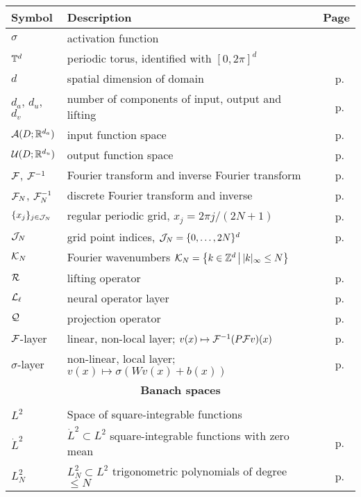 \documentclass[reqno,a4paper]{amsart}
\begin{document}
\begin{center}

\begin{tabular}{l p{}  r}
\textbf{Symbol} & \textbf{Description} & \textbf{Page}
\\
\hline
$\sigma$ & activation function & \\
$\mathbb{T}^d$ & periodic torus, identified with $[0,2\pi]^d$ & \\
$d$ & spatial dimension of domain & p.~\pageref{setting} \\
$d_a$, $d_u$, $d_v$ & number of components of input, output and lifting & p.~\pageref{setting} \\
$\mathcal{A}(D;\mathbb{R}^{d_a})$ & input function space & p.~\pageref{setting} \\
$\mathcal{U}(D;\mathbb{R}^{d_u})$ & output function space & p.~\pageref{setting} \\
$\mathcal{F}$, $\mathcal{F}^{-1}$ & Fourier transform and inverse Fourier transform & p.~\pageref{eq:ft} \\
$\mathcal{F}_N$, $\mathcal{F}_N^{-1}$ & discrete Fourier transform and inverse & p.~\pageref{eq:dft} \\
$\{x_j\}_{j\in \mathcal{J}_N}$ & regular periodic grid, $x_j = 2\pi j/(2N+1)$ & p.~\pageref{eq:grid} \\
$\mathcal{J}_N$ & grid point indices, $\mathcal{J}_N = \{0,\dots, 2N\}^d$ & p.~\pageref{eq:index} \\
$\mathcal{K}_N$ & Fourier wavenumbers $\mathcal{K}_N = {\left\{ k\in \mathbb{Z}^d \,\middle|\, |k|_\infty \le N \right\}}$ & \\
$\mathcal{R}$ & lifting operator & p.~\pageref{eq:no-r} \\
$\mathcal{L}_\ell$ & neural operator layer & p.~\pageref{eq:fno-layer} \\
$\mathcal{Q}$ & projection operator & p.~\pageref{eq:no-q} \\
$\mathcal{F}$-layer & linear, non-local layer; $v(x)\mapsto \mathcal{F}^{-1}(P\mathcal{F} v)(x)$ & p.~\pageref{sec:fnoprop} \\
$\sigma$-layer & non-linear, local layer; $v(x) \mapsto \sigma(Wv(x) + b(x))$ & p.~\pageref{sec:fnoprop} \\[5pt]
\multicolumn{3}{c}{\textbf{Banach spaces}} \\
\hline && \\
$L^2$ & Space of square-integrable functions &  \\
$\dot{L}^2$ & $\dot{L}^2 \subset L^2$ square-integrable functions with zero mean & p.~\pageref{eq:proj} \\
$L^2_N$ & $L^2_N\subset L^2$ trigonometric polynomials of degree $\le N$ & p.~\pageref{eq:pN} \\

\end{tabular}
\end{center}
\end{document}

